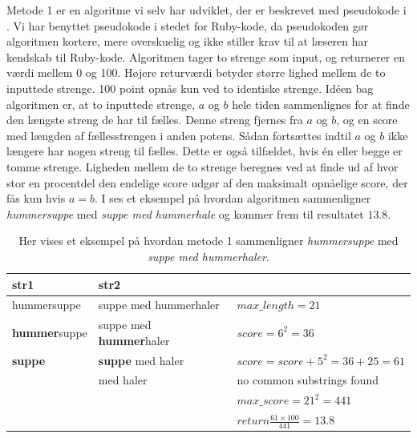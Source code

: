 Metode 1 er en algoritme vi selv har udviklet, der er beskrevet med pseudokode i . Vi har benyttet pseudokode i stedet for Ruby-kode, da pseudokoden gør algoritmen kortere, mere overskuelig og ikke stiller krav til at læseren har kendskab til Ruby-kode. Algoritmen tager to strenge som input, og returnerer en værdi mellem 0 og 100. Højere returværdi betyder større lighed mellem de to inputtede strenge. 100 point opnås kun ved to identiske strenge. Idéen bag algoritmen er, at to inputtede strenge, $a$ og $b$ hele tiden sammenlignes for at finde den længste streng de har til fælles. Denne streng fjernes fra $a$ og $b$, og en score med længden af fællesstrengen i anden potens. Sådan fortsættes indtil $a$ og $b$ ikke længere har nogen streng til fælles. Dette er også tilfældet, hvis én eller begge er tomme strenge. Ligheden mellem de to strenge beregnes ved at finde ud af hvor stor en procentdel den endelige score udgør af den maksimalt opnåelige score, der fås kun hvis $a = b$.
I  ses et eksempel på hvordan algoritmen sammenligner \textit{hummersuppe} med \textit{suppe med hummerhale} og kommer frem til resultatet $13.8$.

\begin{table}
    \begin{tabular}{|l|l|l|}
        \hline
        str1        & str2                  & ~                             \\ \hline
hummersuppe & suppe med hummerhaler & $max\_length = 21$               \\         
        \textbf{hummer}suppe & suppe med \textbf{hummer}haler & $score = 6^2 = 36$               \\ 
        \textbf{suppe}       & \textbf{suppe} med haler       & $score = score + 5^2 = 36 + 25 = 61$                 \\ 
        ~           &  med haler            & no common substrings found        \\ 
        ~           & ~                     & $max\_score = 21^2  = 441$    \\ 
        ~           & ~                     & $return \frac{61 \times 100}{441} = 13.8$ \\
        \hline
    \end{tabular}
    \caption{Her vises et eksempel på hvordan metode 1 sammenligner \textit{hummersuppe} med \textit{suppe med hummerhaler}.}
    \label{table:vores-compare-eksempel}
\end{table}

